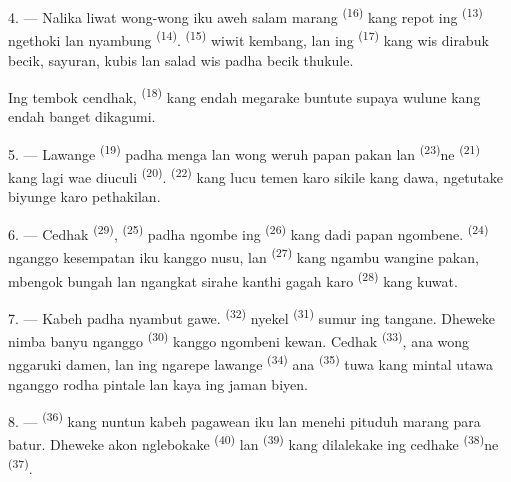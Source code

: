 4. --- Nalika liwat wong-wong iku aweh salam marang  \textsuperscript{(16)} kang repot ing 
\textsuperscript{(13)} ngethoki  lan nyambung
 \textsuperscript{(14)}. 
\textsuperscript{(15)} wiwit kembang, lan ing  \textsuperscript{(17)} kang wis dirabuk becik, sayuran, kubis lan
salad wis padha becik thukule.

Ing tembok cendhak,  \textsuperscript{(18)} kang
endah megarake buntute supaya wulune kang endah banget dikagumi.

\VUsaut{3.0mm}
\VUsaut{3.0mm}

5. --- Lawange  \textsuperscript{(19)} padha menga
lan wong weruh papan pakan lan 
\textsuperscript{(23)}ne  \textsuperscript{(21)} kang
lagi wae diuculi  \textsuperscript{(20)}.
 \textsuperscript{(22)} kang lucu temen karo sikile kang
dawa, ngetutake biyunge karo pethakilan.

6. --- Cedhak  \textsuperscript{(29)}, 
\textsuperscript{(25)} padha ngombe ing 
\textsuperscript{(26)} kang dadi papan ngombene. 
\textsuperscript{(24)} nganggo kesempatan iku kanggo nusu, lan
 \textsuperscript{(27)} kang ngambu wangine pakan,
mbengok bungah lan ngangkat sirahe kanthi gagah karo 
\textsuperscript{(28)} kang kuwat.

7. --- Kabeh padha nyambut gawe. 
\textsuperscript{(32)} nyekel  \textsuperscript{(31)} sumur
ing tangane. Dheweke nimba banyu nganggo 
\textsuperscript{(30)} kanggo ngombeni kewan. Cedhak 
\textsuperscript{(33)}, ana wong nggaruki damen, lan ing ngarepe
lawange  \textsuperscript{(34)} ana 
\textsuperscript{(35)} tuwa kang mintal  utawa
 nganggo rodha pintale lan  kaya ing
jaman biyen.

\VUsaut{3.0mm}
\VUsaut{3.0mm}

8. ---  \textsuperscript{(36)} kang nuntun kabeh
pagawean iku lan menehi pituduh marang para batur. Dheweke akon
nglebokake  \textsuperscript{(40)} lan 
\textsuperscript{(39)} kang dilalekake ing cedhake 
\textsuperscript{(38)}ne  \textsuperscript{(37)}.

